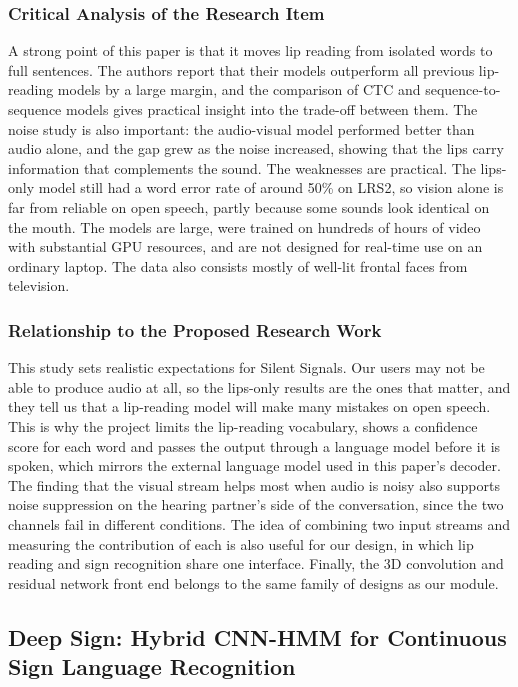 \documentclass{FastFyp}
\begin{document}
\subsubsection*{Critical Analysis of the Research Item}
A strong point of this paper is that it moves lip reading from isolated words to full sentences. The authors report that their models outperform all previous lip-reading models by a large margin, and the comparison of CTC and sequence-to-sequence models gives practical insight into the trade-off between them. The noise study is also important: the audio-visual model performed better than audio alone, and the gap grew as the noise increased, showing that the lips carry information that complements the sound. The weaknesses are practical. The lips-only model still had a word error rate of around 50\% on LRS2, so vision alone is far from reliable on open speech, partly because some sounds look identical on the mouth. The models are large, were trained on hundreds of hours of video with substantial GPU resources, and are not designed for real-time use on an ordinary laptop. The data also consists mostly of well-lit frontal faces from television.

\subsubsection*{Relationship to the Proposed Research Work}
This study sets realistic expectations for Silent Signals. Our users may not be able to produce audio at all, so the lips-only results are the ones that matter, and they tell us that a lip-reading model will make many mistakes on open speech. This is why the project limits the lip-reading vocabulary, shows a confidence score for each word and passes the output through a language model before it is spoken, which mirrors the external language model used in this paper's decoder. The finding that the visual stream helps most when audio is noisy also supports noise suppression on the hearing partner's side of the conversation, since the two channels fail in different conditions. The idea of combining two input streams and measuring the contribution of each is also useful for our design, in which lip reading and sign recognition share one interface. Finally, the 3D convolution and residual network front end belongs to the same family of designs as our module.

\subsection{Deep Sign: Hybrid CNN-HMM for Continuous Sign Language Recognition}
\end{document}
